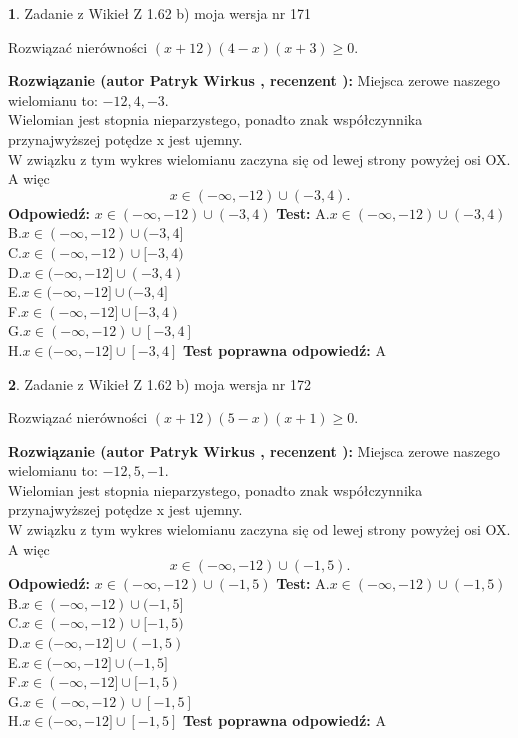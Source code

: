 \documentclass[12pt, a4paper]{article}
\theoremstyle{definition} %
\newtheorem{zad}{}
\newcommand{\zadStart}[1]{\begin{zad}#1\newline}
\newcommand{\zadStop}{\end{zad}}
\newcommand{\rozwStart}[2]{\noindent \textbf{Rozwiązanie (autor #1 , recenzent #2): }\newline}
\newcommand{\rozwStop}{\newline}
\newcommand{\odpStart}{\noindent \textbf{Odpowiedź:}\newline}
\newcommand{\odpStop}{\newline}
\newcommand{\testStart}{\noindent \textbf{Test:}\newline}
\newcommand{\testStop}{\newline}
\newcommand{\kluczStart}{\noindent \textbf{Test poprawna odpowiedź:}\newline}
\newcommand{\kluczStop}{\newline}
\begin{document}
\zadStart{Zadanie z Wikieł Z 1.62 b) moja wersja nr 171}

Rozwiązać nierówności $(x+12)(4-x)(x+3)\ge0$.
\zadStop
\rozwStart{Patryk Wirkus}{}
Miejsca zerowe naszego wielomianu to: $-12, 4, -3$.\\
Wielomian jest stopnia nieparzystego, ponadto znak współczynnika przy\linebreak najwyższej potędze x jest ujemny.\\ W związku z tym wykres wielomianu zaczyna się od lewej strony powyżej osi OX. A więc $$x \in (-\infty,-12) \cup (-3,4).$$
\rozwStop
\odpStart
$x \in (-\infty,-12) \cup (-3,4)$
\odpStop
\testStart
A.$x \in (-\infty,-12) \cup (-3,4)$\\
B.$x \in (-\infty,-12) \cup (-3,4]$\\
C.$x \in (-\infty,-12) \cup [-3,4)$\\
D.$x \in (-\infty,-12] \cup (-3,4)$\\
E.$x \in (-\infty,-12] \cup (-3,4]$\\
F.$x \in (-\infty,-12] \cup [-3,4)$\\
G.$x \in (-\infty,-12) \cup [-3,4]$\\
H.$x \in (-\infty,-12] \cup [-3,4]$
\testStop
\kluczStart
A
\kluczStop



\zadStart{Zadanie z Wikieł Z 1.62 b) moja wersja nr 172}

Rozwiązać nierówności $(x+12)(5-x)(x+1)\ge0$.
\zadStop
\rozwStart{Patryk Wirkus}{}
Miejsca zerowe naszego wielomianu to: $-12, 5, -1$.\\
Wielomian jest stopnia nieparzystego, ponadto znak współczynnika przy\linebreak najwyższej potędze x jest ujemny.\\ W związku z tym wykres wielomianu zaczyna się od lewej strony powyżej osi OX. A więc $$x \in (-\infty,-12) \cup (-1,5).$$
\rozwStop
\odpStart
$x \in (-\infty,-12) \cup (-1,5)$
\odpStop
\testStart
A.$x \in (-\infty,-12) \cup (-1,5)$\\
B.$x \in (-\infty,-12) \cup (-1,5]$\\
C.$x \in (-\infty,-12) \cup [-1,5)$\\
D.$x \in (-\infty,-12] \cup (-1,5)$\\
E.$x \in (-\infty,-12] \cup (-1,5]$\\
F.$x \in (-\infty,-12] \cup [-1,5)$\\
G.$x \in (-\infty,-12) \cup [-1,5]$\\
H.$x \in (-\infty,-12] \cup [-1,5]$
\testStop
\kluczStart
A
\kluczStop
\end{document}
